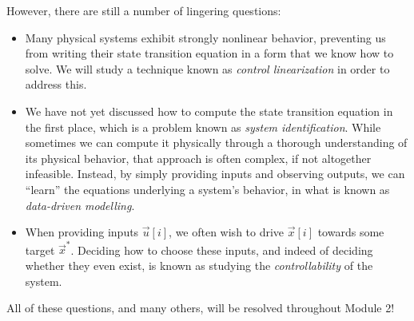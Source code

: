 \documentclass[letterpaper]{article}
\theoremstyle{remark}
\begin{document}
However, there are still a number of lingering questions:
\begin{itemize}
    \item Many physical systems exhibit strongly nonlinear behavior, preventing us from writing their state transition equation in a form that we know how to solve. We will study a technique known as \emph{control linearization} in order to address this. 
    \item We have not yet discussed how to compute the state transition equation in the first place, which is a problem known as \emph{system identification}. While sometimes we can compute it physically through a thorough understanding of its physical behavior, that approach is often complex, if not altogether infeasible. Instead, by simply providing inputs and observing outputs, we can ``learn'' the equations underlying a system's behavior, in what is known as \emph{data-driven modelling}.
    \item When providing inputs $\vec{u}[i]$, we often wish to drive $\vec{x}[i]$ towards some target $\vec{x}^*$. Deciding how to choose these inputs, and indeed of deciding whether they even exist, is known as studying the \emph{controllability} of the system.
\end{itemize}

All of these questions, and many others, will be resolved throughout Module 2!
\end{document}

